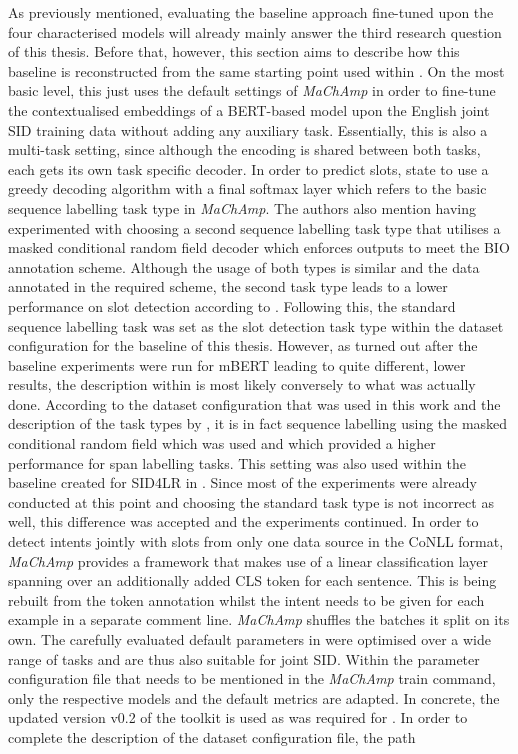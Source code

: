 \documentclass[11pt,a4paper,twoside,openright]{scrbook}
\begin{document}
As previously mentioned, evaluating the baseline approach fine-tuned upon the four characterised models will already mainly answer the third research question of this thesis. Before that, however, this section aims to describe how this baseline is reconstructed from the same starting point used within \citet{van-der-goot-etal-2021-masked}. On the most basic level, this just uses the default settings of \textit{MaChAmp} \citep{van-der-goot-etal-2021-massive} in order to fine-tune the contextualised embeddings of a BERT-based model upon the English joint SID training data without adding any auxiliary task. Essentially, this is also a multi-task setting, since although the encoding is shared between both tasks, each gets its own task specific decoder. In order to predict slots, \citet{van-der-goot-etal-2021-masked} state to use a greedy decoding algorithm with a final softmax layer which refers to the basic sequence labelling task type in \textit{MaChAmp}. The authors also mention having experimented with choosing a second sequence labelling task type that utilises a masked conditional random field decoder which enforces outputs to meet the BIO annotation scheme. Although the usage of both types is similar and the data annotated in the required scheme, the second task type leads to a lower performance on slot detection according to \citet{van-der-goot-etal-2021-masked}. Following this, the standard sequence labelling task was set as the slot detection task type within the dataset configuration for the baseline of this thesis. However, as turned out after the baseline experiments were run for mBERT leading to quite different, lower results, the description within \citet{van-der-goot-etal-2021-masked} is most likely conversely to what was actually done. According to the dataset configuration that was used in this work and the description of the task types by \citet{van-der-goot-etal-2021-massive}, it is in fact sequence labelling using the masked conditional random field which was used and which provided a higher performance for span labelling tasks. This setting was also used within the baseline created for SID4LR in \citet{2023-findings-vardial}. Since most of the experiments were already conducted at this point and choosing the standard task type is not incorrect as well, this difference was accepted and the experiments continued. In order to detect intents jointly with slots from only one data source in the CoNLL format, \textit{MaChAmp} provides a framework that makes use of a linear classification layer spanning over an additionally added CLS token for each sentence. This is being rebuilt from the token annotation whilst the intent needs to be given for each example in a separate comment line. \textit{MaChAmp} shuffles the batches it split on its own. The carefully evaluated default parameters in \citet{van-der-goot-etal-2021-massive} were optimised over a wide range of tasks and are thus also suitable for joint SID. Within the parameter configuration file that needs to be mentioned in the \textit{MaChAmp} train command, only the respective models and the default metrics are adapted. In concrete, the updated version v0.2 of the toolkit is used as was required for \citet{2023-findings-vardial}. In order to complete the description of the dataset configuration file, the path 
\end{document}
